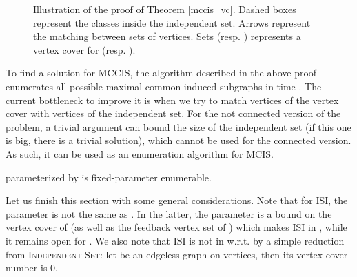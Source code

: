 \begin{figure}[htb!]
\begin{center}


\end{center}



\caption{Illustration of the proof of Theorem \ref{mccis_vc}. Dashed boxes represent the classes inside the independent set. Arrows represent the matching between sets of vertices. Sets  (resp. ) represents a vertex cover for  (resp. ).}
\label{vcvc}
\end{figure}



To find a solution for MCCIS, the algorithm described in the above proof enumerates all possible maximal common induced subgraphs in time . 
The current bottleneck to improve it is when we try to match vertices of the vertex cover with vertices of the independent set.
For the not connected version of the problem, a trivial argument can bound the size of the independent set (if this one is big, there is a trivial solution), which cannot be used for the connected version.
As such, it can be used as an enumeration algorithm for MCIS. 




\begin{corollary}
\mcis parameterized by  is fixed-parameter enumerable.
\end{corollary}





Let us finish this section with some general considerations.
Note that for ISI, the parameter  is not the same 
as . 
In the latter, the parameter is a bound on the vertex cover of  (as well as the feedback vertex set of ) which makes ISI in , while it remains open for . 
We also note that ISI is not in  w.r.t.  by a simple reduction from \textsc{Independent Set}: let  be an edgeless graph on  vertices, then its vertex cover number is 0.

